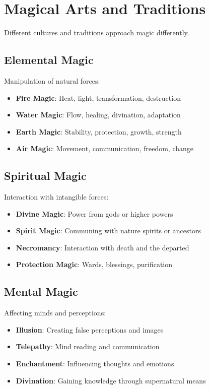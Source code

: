 \section{Magical Arts and Traditions} 

Different cultures and traditions approach magic differently.

\subsection*{Elemental Magic} 
Manipulation of natural forces:
\begin{itemize}
\item \textbf{Fire Magic}: Heat, light, transformation, destruction
\item \textbf{Water Magic}: Flow, healing, divination, adaptation
\item \textbf{Earth Magic}: Stability, protection, growth, strength
\item \textbf{Air Magic}: Movement, communication, freedom, change
\end{itemize}

\subsection*{Spiritual Magic} 
Interaction with intangible forces:
\begin{itemize}
\item \textbf{Divine Magic}: Power from gods or higher powers
\item \textbf{Spirit Magic}: Communing with nature spirits or ancestors
\item \textbf{Necromancy}: Interaction with death and the departed
\item \textbf{Protection Magic}: Wards, blessings, purification
\end{itemize}

\subsection*{Mental Magic} 
Affecting minds and perceptions:
\begin{itemize}
\item \textbf{Illusion}: Creating false perceptions and images
\item \textbf{Telepathy}: Mind reading and communication
\item \textbf{Enchantment}: Influencing thoughts and emotions
\item \textbf{Divination}: Gaining knowledge through supernatural means
\end{itemize}

